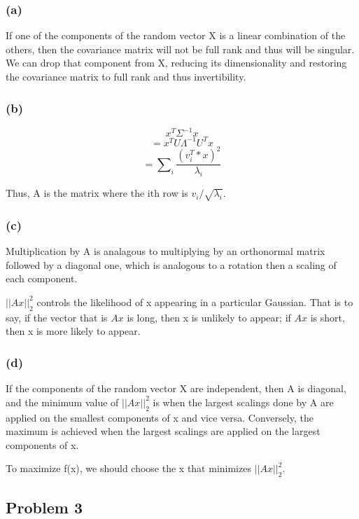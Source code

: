 \documentclass{article}
\begin{document}
\subsubsection{(a)}\label{a}

If one of the components of the random vector X is a linear combination
of the others, then the covariance matrix will not be full rank and thus
will be singular. We can drop that component from X, reducing its
dimensionality and restoring the covariance matrix to full rank and thus
invertibility.

\subsubsection{(b)}\label{b}

\[x^T \Sigma^{-1} x\] \[=x^TU\Lambda^{-1} U^T x\]
\[=\sum\nolimits_i \frac{(v_i^T * x)^2}{\lambda_i}\]

Thus, A is the matrix where the ith row is \(v_i/\sqrt{\lambda_i}\).

\subsubsection{(c)}\label{c}

Multiplication by A is analagous to multiplying by an orthonormal matrix
followed by a diagonal one, which is analogous to a rotation then a
scaling of each component.

\(||Ax||_2^2\) controls the likelihood of x appearing in a particular
Gaussian. That is to say, if the vector that is \(Ax\) is long, then x
is unlikely to appear; if \(Ax\) is short, then x is more likely to
appear.

\subsubsection{(d)}\label{d}

If the components of the random vector X are independent, then A is
diagonal, and the minimum value of \(||Ax||_2^2\) is when the largest
scalings done by A are applied on the smallest components of x and vice
versa. Conversely, the maximum is achieved when the largest scalings are
applied on the largest components of x.

To maximize f(x), we should choose the x that minimizes \(||Ax||_2^2\).


    \subsection{Problem 3}
\end{document}

